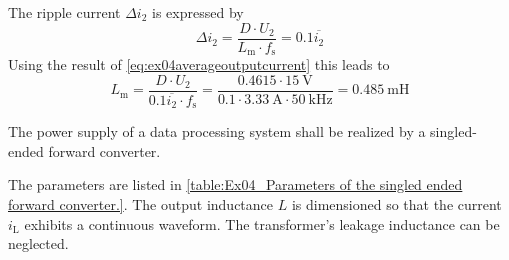 \begin{solutionblock}
    The ripple current $\Delta i_\mathrm{2}$ is expressed by
    \begin{equation}
        \Delta i_\mathrm{2}= \frac{D \cdot U_\mathrm{2}}{L_\mathrm{m} \cdot f_\mathrm{s}} = 0.1 \overline{i_\mathrm{2}}
    \end{equation}
    Using the result of \eqref{eq:ex04averageoutputcurrent} this leads to
    \begin{equation}
        L_\mathrm{m}  = \frac{D \cdot U_\mathrm{2}}{0.1 \overline{i_\mathrm{2}} \cdot f_\mathrm{s}} 
        = \frac{0.4615 \cdot \SI{15}{\volt}}{0.1 \cdot \SI{3.33}{\ampere} \cdot \SI{50}{\kilo\hertz}}=\SI{0.485}{\milli\henry}
    \end{equation}    
\end{solutionblock}





The power supply of a data processing system shall be realized by a singled-ended forward converter.



\FloatBarrier
The parameters are listed in \autoref{table:Ex04_Parameters of the singled ended forward converter.}.
The output inductance $L$ is dimensioned so that the current $i_\mathrm{L}$ exhibits a continuous waveform.
The transformer's leakage inductance can be neglected.

